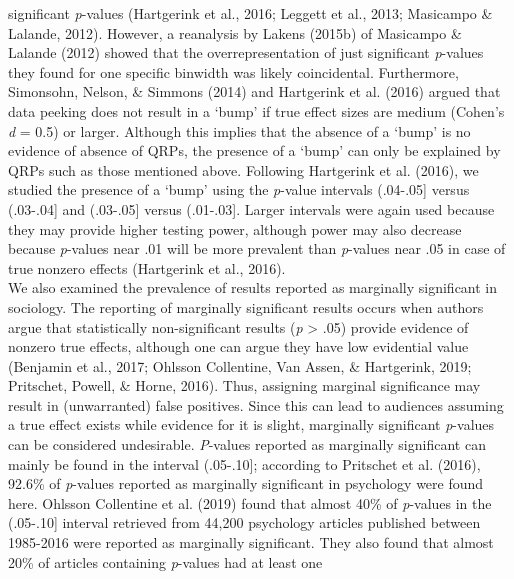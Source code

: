 \documentclass[
  12pt,
]{article}
\begin{document}
significant \emph{p}-values (Hartgerink et al., 2016; Leggett et al.,
2013; Masicampo \& Lalande, 2012). However, a reanalysis by Lakens
(2015b) of Masicampo \& Lalande (2012) showed that the
overrepresentation of just significant \emph{p}-values they found for
one specific binwidth was likely coincidental. Furthermore, Simonsohn,
Nelson, \& Simmons (2014) and Hartgerink et al. (2016) argued that data
peeking does not result in a `bump' if true effect sizes are medium
(Cohen's \emph{d} = 0.5) or larger. Although this implies that the
absence of a `bump' is no evidence of absence of QRPs, the presence of a
`bump' can only be explained by QRPs such as those mentioned above.
Following Hartgerink et al. (2016), we studied the presence of a `bump'
using the \emph{p}-value intervals (.04-.05{]} versus (.03-.04{]} and
(.03-.05{]} versus (.01-.03{]}. Larger intervals were again used because
they may provide higher testing power, although power may also decrease
because \emph{p}-values near .01 will be more prevalent than
\emph{p}-values near .05 in case of true nonzero effects (Hartgerink et
al., 2016).\\
\hspace*{0.333em}\hspace*{0.333em}\hspace*{0.333em}\hspace*{0.333em}We
also examined the prevalence of results reported as marginally
significant in sociology. The reporting of marginally significant
results occurs when authors argue that statistically non-significant
results (\emph{p} \textgreater{} .05) provide evidence of nonzero true
effects, although one can argue they have low evidential value (Benjamin
et al., 2017; Ohlsson Collentine, Van Assen, \& Hartgerink, 2019;
Pritschet, Powell, \& Horne, 2016). Thus, assigning marginal
significance may result in (unwarranted) false positives. Since this can
lead to audiences assuming a true effect exists while evidence for it is
slight, marginally significant \emph{p}-values can be considered
undesirable. \emph{P}-values reported as marginally significant can
mainly be found in the interval (.05-.10{]}; according to Pritschet et
al. (2016), 92.6\% of \emph{p}-values reported as marginally significant
in psychology were found here. Ohlsson Collentine et al. (2019) found
that almost 40\% of \emph{p}-values in the (.05-.10{]} interval
retrieved from 44,200 psychology articles published between 1985-2016
were reported as marginally significant. They also found that almost
20\% of articles containing \emph{p}-values had at least one
\end{document}
